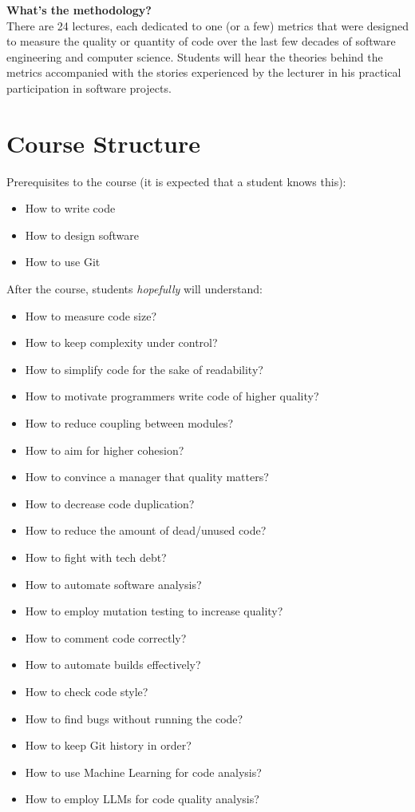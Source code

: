 \documentclass[nobrand,anonymous,nodate,nosecurity]{huawei}
\begin{document}
{\textbf{What's the methodology?}\\
There are 24 lectures, each dedicated to one (or a few) metrics that
were designed to measure the quality or quantity of code over the last
few decades of software engineering and computer science. Students will
hear the theories behind the metrics accompanied with the stories
experienced by the lecturer in his practical participation in software
projects.

\newpage
\section*{Course Structure}

Prerequisites to the course (it is expected that a student knows this):

\begin{itemize}
\item How to write code
\item How to design software
\item How to use Git
\end{itemize}

After the course, students \emph{hopefully} will understand:

\begin{itemize}
\item How to measure code size?
\item How to keep complexity under control?
\item How to simplify code for the sake of readability?
\item How to motivate programmers write code of higher quality?
\item How to reduce coupling between modules?
\item How to aim for higher cohesion?
\item How to convince a manager that quality matters?
\item How to decrease code duplication?
\item How to reduce the amount of dead/unused code?
\item How to fight with tech debt?
\item How to automate software analysis?
\item How to employ mutation testing to increase quality?
\item How to comment code correctly?
\item How to automate builds effectively?
\item How to check code style?
\item How to find bugs without running the code?
\item How to keep Git history in order?
\item How to use Machine Learning for code analysis?
\item How to employ LLMs for code quality analysis?
\end{itemize}

}
\end{document}

